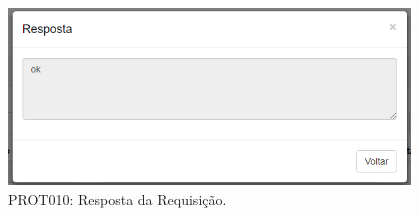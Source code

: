 \begin{anexosenv}
\begin{figure}[htbp]
    \centering
    \includegraphics[width=0.95\textwidth]{figuras/prototipo010.png}
    \caption[PROT010: Resposta da Requisição]{PROT010: Resposta da Requisição.}
    \label{PROT010}
\end{figure}

\end{anexosenv}